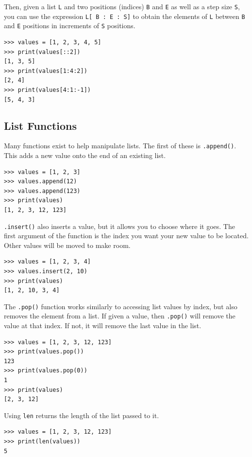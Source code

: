 \documentclass[11pt]{cselabheader}
\begin{document}
Then, given a list \lstinline!L! and two positions (indices) \lstinline!B! and
\lstinline!E! as well as a step size \lstinline!S!, you can use the expression
\lstinline!L[ B : E : S]! to obtain the elements of \lstinline!L! between
\lstinline!B! and \lstinline!E! positions in increments of \lstinline!S!
positions.

\begin{lstlisting}[style=ipython]
>>> values = [1, 2, 3, 4, 5]
>>> print(values[::2])
[1, 3, 5]
>>> print(values[1:4:2])
[2, 4]
>>> print(values[4:1:-1])
[5, 4, 3]
\end{lstlisting}

\subsection{List Functions}
Many functions exist to help manipulate lists. The first of these is
\lstinline{.append()}. This adds a new value onto the end of an existing list.

\begin{lstlisting}[style=ipython]
>>> values = [1, 2, 3]
>>> values.append(12)
>>> values.append(123)
>>> print(values)
[1, 2, 3, 12, 123]
\end{lstlisting}

\lstinline{.insert()} also inserts a value, but it allows you to choose where it
goes. The first argument of the function is the index you want your new value to
be located. Other values will be moved to make room.

\begin{lstlisting}[style=ipython]
>>> values = [1, 2, 3, 4]
>>> values.insert(2, 10)
>>> print(values)
[1, 2, 10, 3, 4]
\end{lstlisting}

The \lstinline{.pop()} function works similarly to accessing list values by
index, but also removes the element from a list. If given a value, then
\lstinline{.pop()} will remove the value at that index. If not, it will remove
the last value in the list.

\begin{lstlisting}[style=ipython]
>>> values = [1, 2, 3, 12, 123]
>>> print(values.pop())
123
>>> print(values.pop(0))
1
>>> print(values)
[2, 3, 12]
\end{lstlisting}


Using \lstinline{len} returns the length of the list passed to it.

\begin{lstlisting}[style=ipython]
>>> values = [1, 2, 3, 12, 123]
>>> print(len(values))
5
\end{lstlisting}
\end{document}
